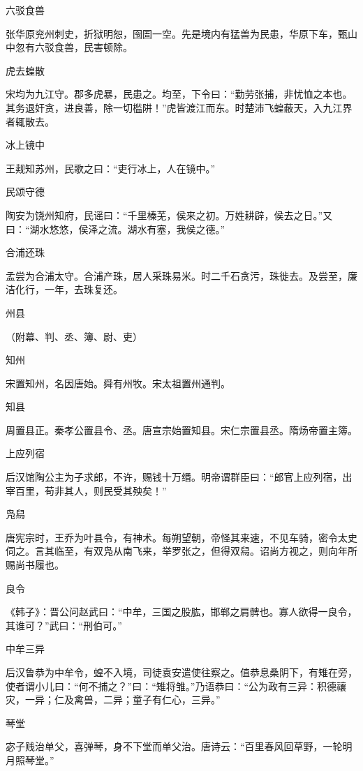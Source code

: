 \documentclass[a4paper,12pt,UTF8,twoside]{ctexbook}
\begin{document}
    六驳食兽
    
    张华原兖州刺史，折狱明恕，囹圄一空。先是境内有猛兽为民患，华原下车，甄山中忽有六驳食兽，民害顿除。
    
    虎去蝗散
    
    宋均为九江守。郡多虎暴，民患之。均至，下令曰：“勤劳张捕，非忧恤之本也。其务退奸贪，进良善，除一切槛阱！”虎皆渡江而东。时楚沛飞蝗蔽天，入九江界者辄散去。
    
    冰上镜中
    
    王觌知苏州，民歌之曰：“吏行冰上，人在镜中。”
    
    民颂守德
    
    陶安为饶州知府，民谣曰：“千里榛芜，侯来之初。万姓耕辟，侯去之日。”又曰：“湖水悠悠，侯泽之流。湖水有塞，我侯之德。”
    
    合浦还珠
    
    孟尝为合浦太守。合浦产珠，居人采珠易米。时二千石贪污，珠徙去。及尝至，廉洁化行，一年，去珠复还。
    
    州县
    
    （附幕、判、丞、簿、尉、吏）
    
    知州
    
    宋置知州，名因唐始。舜有州牧。宋太祖置州通判。
    
    知县
    
    周置县正。秦孝公置县令、丞。唐宣宗始置知县。宋仁宗置县丞。隋炀帝置主簿。
    
    上应列宿
    
    后汉馆陶公主为子求郎，不许，赐钱十万缗。明帝谓群臣曰：“郎官上应列宿，出宰百里，苟非其人，则民受其殃矣！”
    
    凫舄
    
    唐宪宗时，王乔为叶县令，有神术。每朔望朝，帝怪其来速，不见车骑，密令太史伺之。言其临至，有双凫从南飞来，举罗张之，但得双舄。诏尚方视之，则向年所赐尚书履也。
    
    良令
    
    《韩子》：晋公问赵武曰：“中牟，三国之股肱，邯郸之肩髀也。寡人欲得一良令，其谁可？”武曰：“刑伯可。”
    
    中牟三异
    
    后汉鲁恭为中牟令，蝗不入境，司徒袁安遣使往察之。值恭息桑阴下，有雉在旁，使者谓小儿曰：“何不捕之？”曰：“雉将雏。”乃语恭曰：“公为政有三异：积德禳灾，一异；仁及禽兽，二异；童子有仁心，三异。”
    
    琴堂
    
    宓子贱治单父，喜弹琴，身不下堂而单父治。唐诗云：“百里春风回草野，一轮明月照琴堂。”
    
\end{document}
